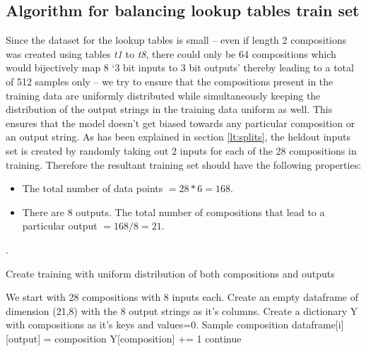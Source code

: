 \begin{appendix}
	
\chapter{Algorithm for balancing lookup tables train set}\label{Chapter:results}

Since the dataset for the lookup tables is small -- even if length 2 compositions was created using tables \textit{t1} to \textit{t8}, there could only be 64 compositions which would bijectively map 8 \lq  3 bit inputs to 3 bit outputs\rq{} thereby leading to a total of 512 samples only -- we try to ensure that the compositions present in the training data are uniformly distributed while simultaneously keeping the distribution of the output strings in the training data uniform as well. This ensures that the model doesn't get biased towards any particular composition or an output string. As has been explained in section \ref{lt:splits}, the heldout inputs set is created by randomly taking out 2 inputs for each of the 28 compositions in training. Therefore the resultant training set should have the following properties:
\begin{itemize}
	\item The total number of data points  $= 28*6 = 168$.
	\item There are 8 outputs. The total number of compositions that lead to a particular output $=168/8 = 21$.
\end{itemize}

.
\begin{algorithm}
	\caption{Create training with uniform distribution of both compositions and outputs}
	\begin{algorithmic}
		\STATE We start with 28 compositions with 8 inputs each.
		\STATE Create an empty dataframe of dimension (21,8) with the 8 output strings as it's columns.
		\STATE Create a dictionary Y with compositions as it's keys and values=0.
		\FOR {i in range [0, 21)}
		\STATE Sample composition
		\STATE dataframe[i][output] = composition
		\STATE Y[composition] += 1
		\ELSE
		\STATE continue
		\ENDIF
		\ENDFOR
		\ENDFOR		
	\end{algorithmic}
\end{algorithm}

\end{appendix}